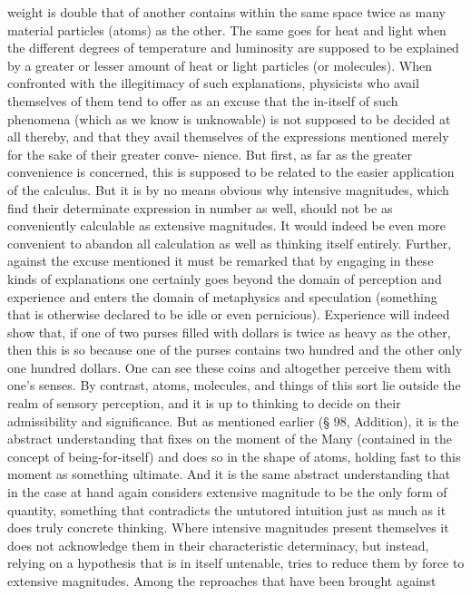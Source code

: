 {{weight is double that of another contains within the same space twice as many
material particles (atoms) as the other. The same goes for heat and light when the
different degrees of temperature and luminosity are supposed to be explained by a
greater or lesser amount of heat or light particles (or molecules). When confronted
with the illegitimacy of such explanations, physicists who avail themselves of them
tend to offer as an excuse that the in-itself of such phenomena (which as we know
is unknowable) is not supposed to be decided at all thereby, and that they avail
themselves of the expressions mentioned merely for the sake of their greater conve-
nience. But first, as far as the greater convenience is concerned, this is supposed to
be related to the easier application of the calculus. But it is by no means obvious
why intensive magnitudes, which find their determinate expression in number as
well, should not be as conveniently calculable as extensive magnitudes. It would
indeed be even more convenient to abandon all calculation as well as thinking
itself entirely. Further, against the excuse mentioned it must be remarked that by
engaging in these kinds of explanations one certainly goes beyond the domain of
perception and experience and enters the domain of metaphysics and speculation
(something that is otherwise declared to be idle or even pernicious). Experience
will indeed show that, if one of two purses filled with dollars is twice as heavy as
the other, then this is so because one of the purses contains two hundred and the
other only one hundred dollars. One can see these coins and altogether perceive
them with one's senses. By contrast, atoms, molecules, and things of this sort lie
outside the realm of sensory perception, and it is up to thinking to decide on
their admissibility and significance. But as mentioned earlier (§ 98, Addition), it
is the abstract understanding that fixes on the moment of the Many (contained
in the concept of being-for-itself) and does so in the shape of atoms, holding fast
to this moment as something ultimate. And it is the same abstract understanding
that in the case at hand again considers extensive magnitude to be the only form
of quantity, something that contradicts the untutored intuition just as much as
it does truly concrete thinking. Where intensive magnitudes present themselves
it does not acknowledge them in their characteristic determinacy, but instead,
relying on a hypothesis that is in itself untenable, tries to reduce them by force
to extensive magnitudes. Among the reproaches that have been brought against
}}
